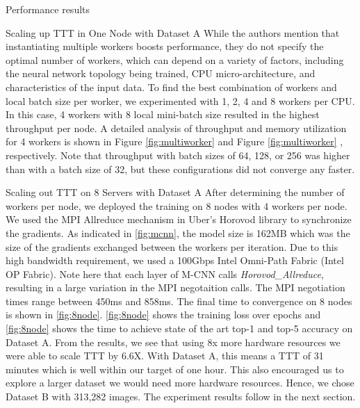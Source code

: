 \begin{section}{Performance results}
\begin{subsection}{Scaling up TTT in One Node with Dataset A}
\noindent While the authors mention that instantiating multiple workers boosts performance, they do not specify the optimal number of workers, which can depend on a variety of factors, including the neural network topology being trained, CPU micro-architecture, and characteristics of the input data. To find the best combination of workers and local batch size per worker, we experimented with 1, 2, 4 and 8 workers per CPU. In this case, 4 workers with 8 local mini-batch size resulted in the highest throughput per node. A detailed analysis of throughput and memory utilization for 4 workers is shown in Figure \ref{fig:multiworker}  and Figure \ref{fig:multiworker} , respectively. Note that throughput with batch sizes of 64, 128, or 256 was higher than with a batch size of 32, but these configurations did not converge any faster.
	\end{subsection}
	\begin{subsection}{Scaling out TTT on 8 Servers with Dataset A}
		\label{sec:scaleout_dataset1}
\noindent After determining the number of workers per node, we deployed the training on 8 nodes with 4 workers per node. We used the MPI Allreduce mechanism in Uber's Horovod library to synchronize the gradients. As indicated in \autoref{fig:mcnn}, the model size is 162MB which was the size of the gradients exchanged between the workers per iteration. Due to this high bandwidth requirement, we used a 100Gbps Intel\textregistered{} Omni-Path Fabric (Intel\textregistered{} OP Fabric). Note here that each layer of M-CNN calls \emph{Horovod\_Allreduce}, resulting in a large variation in the MPI negotaition calls. The MPI negotiation times range between 450ms and 858ms. The final time to convergence on 8 nodes is shown in \autoref{fig:8node}. \autoref{fig:8node} shows the training loss over epochs and \autoref{fig:8node} shows the time to achieve state of the art top-1 and top-5 accuracy on Dataset A. From the results, we see that using 8x more hardware resources we were able to scale TTT by 6.6X. With Dataset A, this means a TTT of 31 minutes which is well within our target of one hour. This also encouraged us to explore a larger dataset we would need more hardware resources. Hence, we chose Dataset B with 313,282 images. The experiment results follow in the next section.


\end{subsection}
\end{section}
